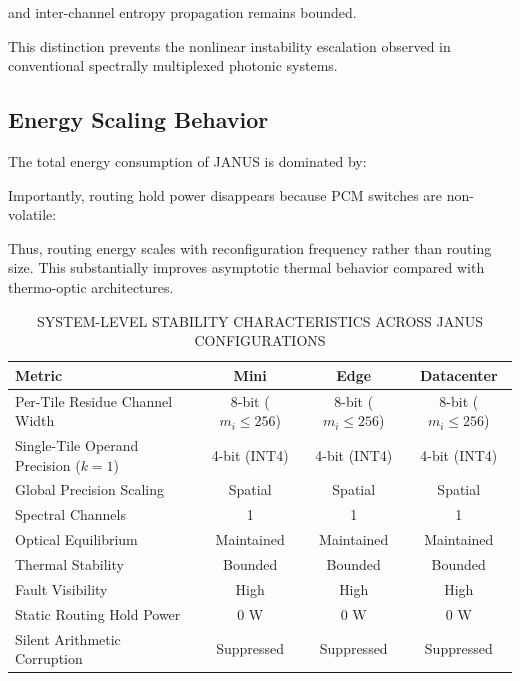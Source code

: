 \documentclass[journal]{IEEEtran}
\begin{document}
and inter-channel entropy propagation remains bounded. 

This distinction prevents the nonlinear instability escalation observed in conventional spectrally multiplexed photonic systems.

\subsection{\textbf{Energy Scaling Behavior}}

The total energy consumption of JANUS is dominated by:

\begin{center}
\end{center}

Importantly, routing hold power disappears because PCM switches are non-volatile:
\begin{center}
\end{center}

Thus, routing energy scales with reconfiguration frequency rather than routing size. This substantially improves asymptotic thermal behavior compared with thermo-optic architectures.

\begin{table}[htbp]
\centering
\small
\setlength{\tabcolsep}{3pt}
\caption{SYSTEM-LEVEL STABILITY CHARACTERISTICS ACROSS JANUS CONFIGURATIONS}
\label{tab:table14}
\begin{tabular}{lccc}
\toprule
Metric & Mini & Edge & Datacenter \\
\midrule
Per-Tile Residue Channel Width & 8-bit ($m_i \le 256$) & 8-bit ($m_i \le 256$) & 8-bit ($m_i \le 256$) \\
Single-Tile Operand Precision ($k=1$) & 4-bit (INT4) & 4-bit (INT4) & 4-bit (INT4) \\
Global Precision Scaling & Spatial & Spatial & Spatial \\
Spectral Channels & 1 & 1 & 1 \\
Optical Equilibrium & Maintained & Maintained & Maintained \\
Thermal Stability & Bounded & Bounded & Bounded \\
Fault Visibility & High & High & High \\
Static Routing Hold Power & 0 W & 0 W & 0 W \\
Silent Arithmetic Corruption & Suppressed & Suppressed & Suppressed \\
\bottomrule
\end{tabular}
\end{table}
\end{document}
